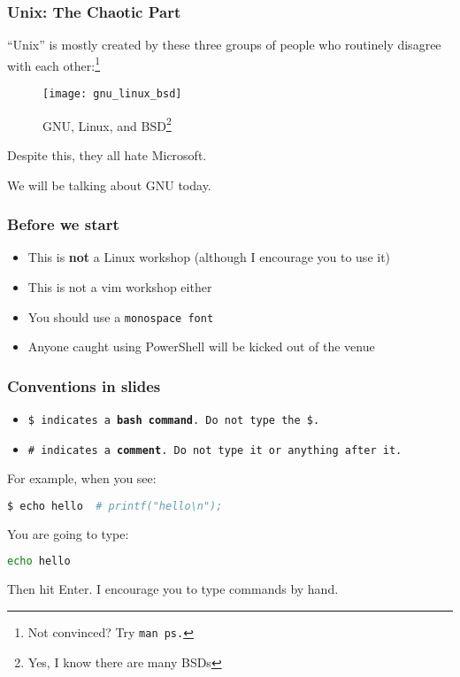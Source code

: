 \begin{frame}
\frametitle{Unix: The Chaotic Part}
``Unix'' is mostly created by these three groups of people who routinely
disagree with each other:\footnote{Not convinced? Try \tt{man ps}.}
\begin{figure}[h]
    \centering
    \texttt{[image: gnu\_linux\_bsd]}
    \caption{GNU, Linux, and BSD\footnote{Yes, I know there are many BSDs}}
\end{figure}
Despite this, they all hate Microsoft.

We will be talking about GNU today.
\end{frame}

\begin{frame}
\frametitle{Before we start}
\begin{itemize}
    \item This is \textbf{not} a Linux workshop
        (although I encourage you to use it)
    \item This is not a vim workshop either
    \item You should use a \tt{monospace} font
    \item Anyone caught using PowerShell will be kicked out of the venue
\end{itemize}
\end{frame}

\begin{frame}[fragile]
\frametitle{Conventions in slides}
\begin{itemize}
    \item \tt{\$} indicates a \textbf{bash command}.
        Do not type the \tt{\$}.
    \item \tt{\#} indicates a \textbf{comment}.
        Do not type it or anything after it.
\end{itemize}
For example, when you see:
\begin{lstlisting}[language=bash]
$ echo hello  # printf("hello\n");
\end{lstlisting}
You are going to type:
\begin{lstlisting}[language=bash]
echo hello
\end{lstlisting}
Then hit Enter. I encourage you to type commands by hand.
\end{frame}
